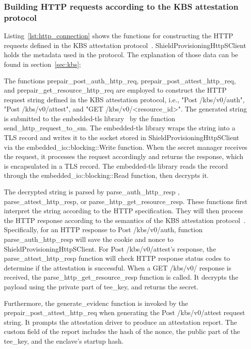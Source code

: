 \subsubsection{Building HTTP requests according to the KBS attestation protocol}
Listing~\ref{lst:http_connection} shows the functions for constructing the HTTP requests defined in the KBS attestation protocol~\cite*{kbs_Attestation_protocol}. ShieldProvisioningHttpSClient holds the metadata used in the protocol. The explanation of those data can be found in section~\ref{sec:kbs};


The functions prepair\_post\_auth\_http\_req, prepair\_post\_attest\_http\_req, and prepair\_get\_resource\_http\_req are employed to construct the HTTP request string defined in the KBS attestation protocol, i.e., "Post /kbs/v0/auth", "Post /kbs/v0/attest", and "GET /kbs/v0/<resource\_id>". 
The generated string is submitted to the embedded-tls library~\cite*{embede_tls} by the function send\_http\_request\_to\_sm. The embedded-tls library wraps the string into a TLS record and writes it to the socket stored in ShieldProvisioningHttpSClient via the embedded\_io::blocking::Write 
function. When the secret manager receives the request, it processes the request accordingly and returns the response, which is encapsulated in a TLS record. The embedded-tls library reads the record through the embedded\_io::blocking::Read function, then decrypts it.

The decrypted string is parsed by parse\_auth\_http\_resp , parse\_attest\_http\_resp, or parse\_http\_get\_resource\_resp. These functions first interpret the string according to the HTTP specification. They will then process the HTTP 
response according to the semantics of the KBS attestation protocol~\cite*{kbs_Attestation_protocol}. Specifically, for an HTTP response to Post /kbs/v0/auth, function parse\_auth\_http\_resp will save the cookie and nonce to ShieldProvisioningHttpSClient. For Post /kbs/v0/attest's response, the parse\_attest\_http\_resp function will 
check HTTP response status codes to determine if the attestation is successful. When a GET /kbs/v0/ response is received, the parse\_http\_get\_resource\_resp function is called. It decrypts the payload using the private part of tee\_key, and returns the secret.

Furthermore, the generate\_evidenc function is invoked by the prepair\_post\_attest\_http\_req when generating the Post /kbs/v0/attest request string. It prompts the attestation driver to produce an attestation report. The custom field of the report includes the hash of the nonce, 
the public part of the tee\_key, and the enclave's startup hash.                                                                                                                                                                                                                                                                                                



